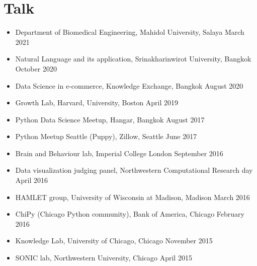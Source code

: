 \section{\sc Talk}

\begin{itemize}[leftmargin=0cm, label={}]

\item Department of Biomedical Engineering, Mahidol University, Salaya \hfill March 2021
\item Natural Language and its application, Srinakharinwirot University, Bangkok \hfill October 2020
\item Data Science in e-commerce, Knowledge Exchange, Bangkok \hfill August 2020
\item Growth Lab, Harvard, University, Boston \hfill April 2019
\item Python Data Science  Meetup, Hangar, Bangkok \hfill August 2017
\item Python Meetup Seattle (Puppy), Zillow, Seattle \hfill June 2017
\item Brain and Behaviour lab, Imperial College London \hfill September 2016
\item Data visualization judging panel, Northwestern Computational Research day \hfill April 2016
\item HAMLET group, University of Wisconsin at Madison, Madison \hfill March 2016
\item ChiPy (Chicago Python community), Bank of America, Chicago \hfill February 2016
\item Knowledge Lab, University of Chicago, Chicago \hfill November 2015
\item SONIC lab, Northwestern University, Chicago   \hfill April 2015

\end{itemize}